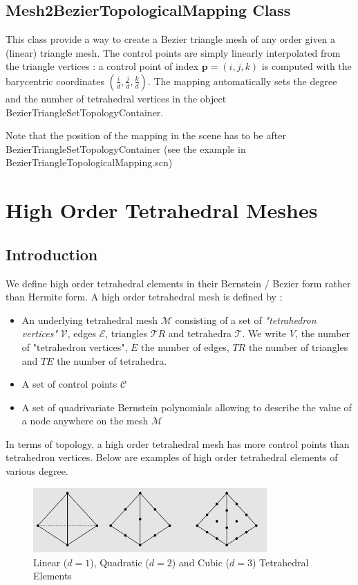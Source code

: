 \documentclass[a4paper,11pt]{article}
\newcommand{\vertices}{{\mathcal V}}
\newcommand{\edges}{{\mathcal E}}
\newcommand{\tetrahedra}{{\mathcal T}}
\newcommand{\triangles}{{\mathcal TR}}
\newcommand{\mesh}{{\mathcal M}}
\newcommand{\controls}{{\mathcal C}}
\newcommand{\nvertices}{{ V}}
\newcommand{\nedges}{{ E}}
\newcommand{\ntriangles}{{ TR}}
\newcommand{\ntetrahedra}{{ TE}}
\newcommand{\degree}{{d}}
\begin{document}
\subsection{Mesh2BezierTopologicalMapping Class}

This class provide a way to create a Bezier triangle mesh of any order given a (linear) triangle mesh. The control points are simply linearly interpolated from the triangle vertices : a control point of index ${\mathbf p}=(i,j,k)$ is computed with the barycentric coordinates $(\frac{i}{\degree},\frac{j}{\degree},\frac{k}{\degree})$. The mapping automatically sets the degree and the number of tetrahedral vertices in the object BezierTriangleSetTopologyContainer.

Note that the position of the mapping in the scene has to be after BezierTriangleSetTopologyContainer (see the example in BezierTriangleTopologicalMapping.scn) 
\section{High Order Tetrahedral Meshes}

\subsection{Introduction}

We define high order tetrahedral elements in their Bernstein / Bezier form rather than Hermite form. 
A high order tetrahedral mesh is defined by :

\begin{itemize}
	\item An underlying tetrahedral mesh $\mesh$ consisting of a set of {\em "tetrahedron vertices"} $\vertices$, edges $\edges$, triangles $\triangles$ and tetrahedra $\tetrahedra$. We write $\nvertices$, the number of "tetrahedron vertices", $\nedges$ the number of edges, $\ntriangles$ the number of triangles and $\ntetrahedra$ the number of tetrahedra. 
	\item A set of control points $\controls$
	\item A set of quadrivariate Bernstein polynomials  allowing to describe the value of a node anywhere on the mesh $\mesh$ 
\end{itemize}
%

In terms of topology, a high order tetrahedral mesh has more control points than tetrahedron vertices.
Below are examples of high order tetrahedral elements of various degree.
\begin{figure}[!htbp]
	\centering
    \includegraphics[width=0.80\textwidth]{HighOrderTetra}
	\caption{Linear ($\degree=1$), Quadratic ($\degree=2$) and Cubic ($\degree=3$) Tetrahedral Elements}
	\label{fig:LinearQuadraticAndCubicTetrahedralElements}
\end{figure}
\end{document}
